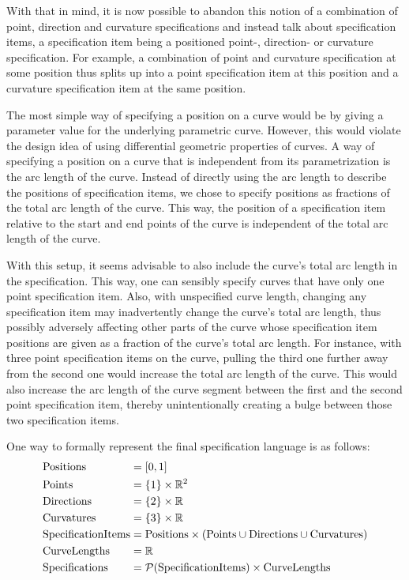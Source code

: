 \documentclass[a4paper]{article}
\begin{document}
				With that in mind, it is now possible to abandon this notion of a combination of point, direction and curvature specifications and instead talk about specification items, a specification item being a positioned point-, direction- or curvature specification. For example, a combination of point and curvature specification at some position thus splits up into a point specification item at this position and a curvature specification item at the same position.

				The most simple way of specifying a position on a curve would be by giving a parameter value for the underlying parametric curve. However, this would violate the design idea of using differential geometric properties of curves. A way of specifying a position on a curve that is independent from its parametrization is the arc length of the curve. Instead of directly using the arc length to describe the positions of specification items, we chose to specify positions as fractions of the total arc length of the curve. This way, the position of a specification item relative to the start and end points of the curve is independent of the total arc length of the curve.

				With this setup, it seems advisable to also include the curve's total arc length in the specification. This way, one can sensibly specify curves that have only one point specification item. Also, with unspecified curve length, changing any specification item may inadvertently change the curve's total arc length, thus possibly adversely affecting other parts of the curve whose specification item positions are given as a fraction of the curve's total arc length. For instance, with three point specification items on the curve, pulling the third one further away from the second one would increase the total arc length of the curve. This would also increase the arc length of the curve segment between the first and the second point specification item, thereby unintentionally creating a bulge between those two specification items.

				One way to formally represent the final specification language is as follows:
				\begin{equation*}
					\begin{alignedat}{2}
						& \mathrm{Positions}          && = \left[ 0,1 \right]\\
						& \mathrm{Points}             && = \left\{ 1 \right\} \times \mathbb{R}^{2}\\
						& \mathrm{Directions}         && = \left\{ 2 \right\} \times \mathbb{R}\\
						& \mathrm{Curvatures}         && = \left\{ 3 \right\} \times \mathbb{R}\\
						& \mathrm{SpecificationItems} && = \mathrm{Positions} \times \left(\mathrm{Points} \cup \mathrm{Directions} \cup \mathrm{Curvatures}\right)\\
						& \mathrm{CurveLengths}       && = \mathbb{R}\\
						& \mathrm{Specifications}     && = \mathcal{P}\!\left( \mathrm{SpecificationItems} \right) \times \mathrm{CurveLengths}
					\end{alignedat}
				\end{equation*}
\end{document}
